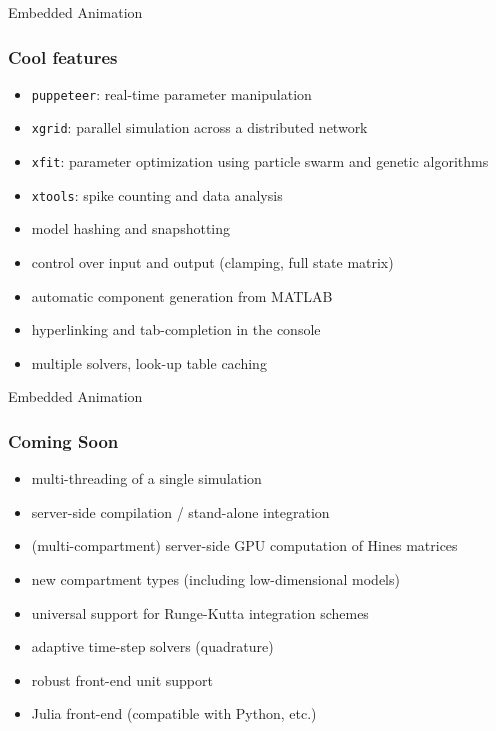 \documentclass{beamer}
\begin{document}
\begin{frame}{Embedded Animation}
  \frametitle{Cool features}

    \begin{itemize}
      \item \texttt{puppeteer}: real-time parameter manipulation
      \item \texttt{xgrid}: parallel simulation across a distributed network
      \item \texttt{xfit}: parameter optimization using particle swarm and genetic algorithms
      \item \texttt{xtools}: spike counting and data analysis
      \item model hashing and snapshotting
      \item control over input and output (clamping, full state matrix)
      \item automatic component generation from MATLAB
      \item hyperlinking and tab-completion in the console
      \item multiple solvers, look-up table caching
    \end{itemize}

\end{frame}


\begin{frame}{Embedded Animation}
  \frametitle{Coming Soon}

    \begin{itemize}
      \item multi-threading of a single simulation
      \item server-side compilation / stand-alone integration
      \item (multi-compartment) server-side GPU computation of Hines matrices
      \item new compartment types (including low-dimensional models)
      \item universal support for Runge-Kutta integration schemes
      \item adaptive time-step solvers (quadrature)
      \item robust front-end unit support
      \item Julia front-end (compatible with Python, etc.)
    \end{itemize}

\end{frame}

\end{document}
